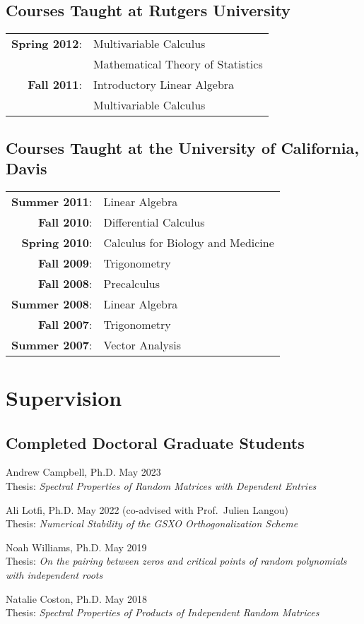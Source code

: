 \documentclass[letterpaper]{article}
\renewenvironment{itemize}{
  \begin{list}{}{
    \setlength{\leftmargin}{1em}
  }
}{
  \end{list}
}
\begin{document}
 
   
   
   
\subsection*{Courses Taught at Rutgers University}   
   \begin{tabular}{r l}
   	{\bf Spring 2012}: & Multivariable Calculus \\
			     	& Mathematical Theory of Statistics \\
	{\bf Fall 2011}: & Introductory Linear Algebra \\
				& Multivariable Calculus
   \end{tabular}

\subsection*{Courses Taught at the University of California, Davis}
    \begin{tabular}{r l}
    	{\bf Summer 2011}: & Linear Algebra \\
	{\bf Fall 2010}: & Differential Calculus \\
	{\bf Spring 2010}: & Calculus for Biology and Medicine \\
	{\bf Fall 2009}: & Trigonometry \\
	{\bf Fall 2008}: & Precalculus \\
	{\bf Summer 2008}: & Linear Algebra \\
	{\bf Fall 2007}: & Trigonometry \\
	{\bf Summer 2007}: & Vector Analysis
   \end{tabular}



\section*{Supervision}

\subsection*{Completed Doctoral Graduate Students}
\begin{itemize}
	\item Andrew Campbell, Ph.D. May 2023 \\
	Thesis: \textit{Spectral Properties of Random Matrices with Dependent Entries}
	\item Ali Lotfi, Ph.D. May 2022 (co-advised with Prof.\  Julien Langou) \\
	Thesis: \textit{Numerical Stability of the GSXO Orthogonalization Scheme}
	\item Noah Williams, Ph.D. May 2019 \\
	Thesis: \textit{On the pairing between zeros and critical points of random polynomials with independent roots}
	\item Natalie Coston, Ph.D. May 2018 \\
	Thesis: \textit{Spectral Properties of Products of Independent Random Matrices}
\end{itemize}
	
\end{document}
